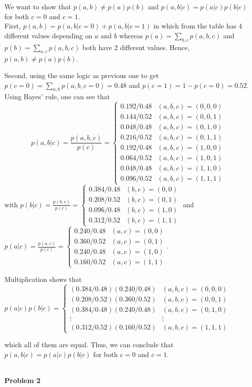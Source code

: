 \documentclass{article}
\begin{document}
\color{blue}
\begin{sol}
  We want to show that $p(a, b) \neq p(a)p(b)$ and $p(a, b|c) = p(a|c)p(b|c)$ for both $c = 0$ and $c = 1$.\\
First, $p(a,b) = p(a,b|c = 0) + p(a,b|c = 1)$ in which from the table has 4 different values depending on $a$ and $b$ whereas
$p(a) = \sum_{b,c}p(a,b,c)$ and $p(b) = \sum_{a,c} p(a,b,c)$ both have 2 different values. Hence, $p(a,b) \neq p(a)p(b)$.

Second, using the same logic as previous one to get $p(c = 0) = \sum_{a,b} p(a,b,c = 0) = 0.48$ and $p(c = 1) = 1-p(c = 0) = 0.52$.\\
Using Bayes' rule, one can see that
$$p(a,b|c) = \frac{p(a,b,c)}{p(c)} = \begin{cases}
    0.192/0.48 & (a,b,c) = (0,0,0) \\
    0.144/0.52 & (a,b,c) = (0,0,1) \\
    0.048/0.48 & (a,b,c) = (0,1,0) \\
    0.216/0.52 & (a,b,c) = (0,1,1) \\
    0.192/0.48 & (a,b,c) = (1,0,0) \\
    0.064/0.52 & (a,b,c) = (1,0,1) \\
    0.048/0.48 & (a,b,c) = (1,1,0) \\
    0.096/0.52 & (a,b,c) = (1,1,1)
\end{cases}$$
with $p(b|c) =\frac{p(b,c)}{p(c)}=\begin{cases}
    0.384/0.48 & (b,c) = (0,0)\\
    0.208/0.52 & (b,c) = (0,1)\\
    0.096/0.48 & (b,c) = (1,0)\\
    0.312/0.52 & (b,c) = (1,1)
\end{cases}$ and $p(a|c) = \frac{p(a,c)}{p(c)}=\begin{cases}
    0.240/0.48 & (a,c) = (0,0)\\
    0.360/0.52 & (a,c) = (0,1)\\
    0.240/0.48 & (a,c) = (1,0)\\
    0.160/0.52 & (a,c) = (1,1) 
\end{cases}$.

Multiplication shows that
$p(a|c)p(b|c) = \begin{cases}
    (0.384/0.48)(0.240/0.48) & (a,b,c) = (0,0,0) \\
    (0.208/0.52)(0.360/0.52) & (a,b,c) = (0,0,1) \\
    (0.384/0.48)(0.240/0.48)& (a,b,c) = (0,1,0) \\
    \vdots & \vdots \\
    (0.312/0.52)(0.160/0.52) & (a,b,c) = (1,1,1)
\end{cases}$ 

which all of them are equal. Thus, we can conclude that $p(a,b|
c) = p(a|c)p(b|c)$ for both $c = 0$ and $c = 1$.
\end{sol}
\color{black}
\leavevmode\\
\noindent
\Large{\textbf{Problem 2}}\normalsize
\\
\end{document}

